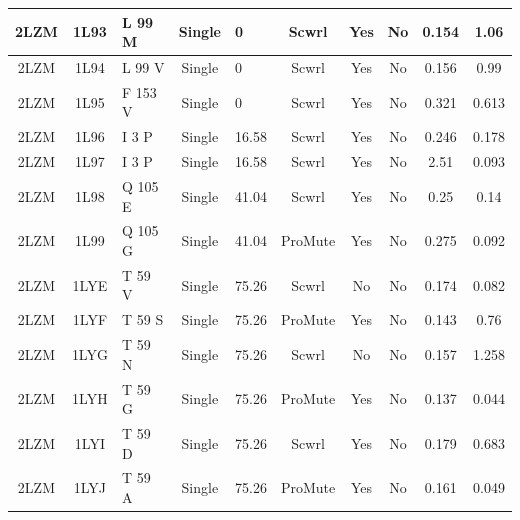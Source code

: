 \documentclass[sigconf]{acmart}
\begin{document}
\begin{table}[]
{\begin{tabular}{|c|c|p{2.8cm}|c|p{2.8cm}|c|c|c|c|c|}
		2LZM & 1L93 & L 99 M & Single & 0 & Scwrl & Yes & No & 0.154 & 1.06 \\ \hline
		2LZM & 1L94 & L 99 V & Single & 0 & Scwrl & Yes & No & 0.156 & 0.99 \\ \hline
		2LZM & 1L95 & F 153 V & Single & 0 & Scwrl & Yes & No & 0.321 & 0.613 \\ \hline
		2LZM & 1L96 & I 3 P & Single & 16.58 & Scwrl & Yes & No & 0.246 & 0.178 \\ \hline
		2LZM & 1L97 & I 3 P & Single & 16.58 & Scwrl & Yes & No & 2.51 & 0.093 \\ \hline
		2LZM & 1L98 & Q 105 E & Single & 41.04 & Scwrl & Yes & No & 0.25 & 0.14 \\ \hline
		2LZM & 1L99 & Q 105 G & Single & 41.04 & ProMute & Yes & No & 0.275 & 0.092 \\ \hline
		2LZM & 1LYE & T 59 V & Single & 75.26 & Scwrl & No & No & 0.174 & 0.082 \\ \hline
		2LZM & 1LYF & T 59 S & Single & 75.26 & ProMute & Yes & No & 0.143 & 0.76 \\ \hline
		2LZM & 1LYG & T 59 N & Single & 75.26 & Scwrl & No & No & 0.157 & 1.258 \\ \hline
		2LZM & 1LYH & T 59 G & Single & 75.26 & ProMute & Yes & No & 0.137 & 0.044 \\ \hline
		2LZM & 1LYI & T 59 D & Single & 75.26 & Scwrl & Yes & No & 0.179 & 0.683 \\ \hline
		2LZM & 1LYJ & T 59 A & Single & 75.26 & ProMute & Yes & No & 0.161 & 0.049 \\ \hline
	\end{tabular}}
\end{table}
\end{document}
